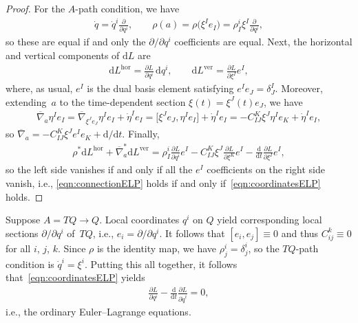 \documentclass[10pt,a4paper]{amsart}
\numberwithin{equation}{section}
\begin{document}
\begin{proof}
 For the $A$-path condition, we have
 \begin{gather*}
 \dot{q} = \dot{q} ^i \frac{ \partial }{ \partial q ^i }, \qquad \rho(a) = \rho \big(\xi ^I e _I \big) = \rho ^i _I \xi ^I \frac{ \partial }{ \partial q ^i },
 \end{gather*}
 so these are equal if and only the $ \partial / \partial q ^i $ coef\/f\/icients are equal. Next, the horizontal and vertical components of $ \mathrm{d} L $ are
 \begin{gather*}
 \mathrm{d} L ^\text{hor} = \frac{ \partial L }{ \partial q ^i } \,\mathrm{d}q ^i , \qquad \mathrm{d} L ^\text{ver}= \frac{ \partial L }{ \partial \xi ^I } e ^I ,
 \end{gather*}
 where, as usual, $ e ^I $ is the dual basis element satisfying $ e ^I e _J = \delta ^I _J $. Moreover, extending~$a$ to the time-dependent section $ \xi (t) = \xi ^J (t) e _J $, we have
 \begin{gather*}
 \overline{ \nabla } _a \eta ^I e _I = \overline{ \nabla } _{ \xi ^J e _J } \eta ^I e _I + \dot{ \eta } ^I e _I= \big[ \xi ^J e _J , \eta ^I e _I \big] + \dot{ \eta } ^I e _I = - C _{ I J } ^K \xi ^J \eta ^I e _K + \dot{ \eta } ^I e _I ,
 \end{gather*}
 so $ \overline{ \nabla } _a = - C _{ I J } ^K \xi ^J e ^I e _K + \mathrm{d}/\mathrm{d}t $. Finally,
 \begin{gather*}
 \rho ^\ast \mathrm{d} L ^\text{hor} + \overline{ \nabla } _a ^\ast
 \mathrm{d} L ^\text{ver} = \rho ^i _I \frac{ \partial L }{ \partial q ^i } e ^I - C _{ I J } ^K \xi ^J \frac{ \partial L
 }{ \partial \xi ^K } e ^I - \frac{\mathrm{d}}{\mathrm{d}t} \frac{ \partial L }{ \partial \xi ^I } e ^I ,
 \end{gather*}
 so the left side vanishes if and only if all the $ e ^I $ coef\/f\/icients on the right side vanish, i.e., \eqref{eqn:connectionELP} holds if and only if~\eqref{eqn:coordinatesELP} holds.
\end{proof}

\begin{Example} \label{ex:tangentELP}
Suppose $ A = T Q \rightarrow Q $. Local coordinates $ q ^i $ on $Q$ yield corresponding local sections $ \partial / \partial q ^i $ of~$TQ$, i.e., $ e _i = \partial / \partial q ^i $. It follows that $ [ e _i , e _j ] \equiv 0 $ and thus $ C ^k _{ i j } \equiv 0 $ for all $ i$, $j$, $k $. Since $ \rho $ is the identity map, we have $ \rho ^i _j = \delta ^i _j $, so the $ T Q $-path condition is $ \dot{q} ^i = \xi ^i $. Putting this all together, it follows that~\eqref{eqn:coordinatesELP} yields
 \begin{gather*}
 \frac{ \partial L }{ \partial q ^i } - \frac{\mathrm{d}}{\mathrm{d}t} \frac{ \partial L }{ \partial \dot{q} ^i } = 0 ,
 \end{gather*}
 i.e., the ordinary Euler--Lagrange equations.
\end{Example}
\end{document}
